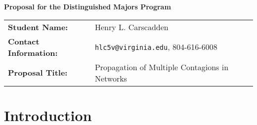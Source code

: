\documentclass[11pt]{article}
\begin{document}
\newtheorem{theorem}{Theorem}[section]
\newtheorem{lemma}{Lemma}[section]
\newtheorem{corollary}{Corollary}[section]
\newtheorem{fact}{Fact}[section]
\newtheorem{definition}{Definition}[section]
\newtheorem{proposition}{Proposition}[section]
\newtheorem{observation}{Observation}[section]
\newtheorem{claim}{Claim}[section]

\newcommand{\cnp}{\textbf{NP}}
\newcommand{\true}{\texttt{True}}
\newcommand{\false}{\texttt{False}}

\newcommand{\QED}{\hfill\rule{2mm}{2mm}}

\newcommand{\irange}{\mbox{$1 \leq i \leq n$}}
\newcommand{\jrange}{\mbox{$1 \leq j \leq m$}}

\newcommand{\dunder}[1]{\underline{\underline{#1}}}

\setlength{\parskip}{3pt}

\normalbaselineskip

\begin{center}
{\Large\textbf{Proposal for the Distinguished Majors Program}} \\ \medskip
\end{center}

\medskip
\noindent
{\large
    \begin{tabular}{ll}
      \textbf{Student Name:} &  Henry L. Carscadden \\ [2ex] 
      \textbf{Contact Information:} &  \texttt{hlc5v@virginia.edu}, 804-616-6008 \\ [2ex]
      \textbf{Proposal Title:} & Propagation of Multiple Contagions
                   in Networks
   \end{tabular}
 }  

\medskip

\section{Introduction}\label{sec:intro}
\end{document}
